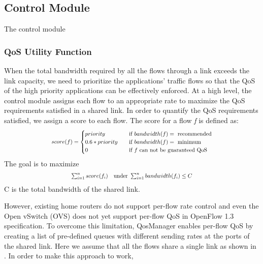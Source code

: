 %

\subsection{Control Module}
The control module 
\subsubsection{QoS Utility Function}
\label{sect:qos untility funciton}
When the total bandwidth required by all the flows through a link exceeds the link capacity, we need to prioritize the applications'
traffic flows so that the QoS of the high priority applications can be effectively enforced. At a high level, the control module
assigns each flow to an appropriate rate to maximize the QoS requirements satisfied in a shared link. In order to quantify the QoS
requirements satisfied, we assign a score to each flow. The score for a flow \emph{f} is defined as:
\begin{equation}
\scalebox{0.8}{
  $score(f) =
    \begin{cases}
      priority       & \quad \text{if } bandwidth(f) = \text{ recommended}\\
      0.6 * priority & \quad \text{if } bandwidth(f) = \text{ minimum}\\
      0              & \quad \text{if } f \text{ can not be guaranteed QoS}\\
    \end{cases}$
}
\end{equation}
The goal is to maximize 
\begin{equation}
\scalebox{0.8}{
 $\sum_{i=1}^{n} score(f_i) \quad \text{under } \sum_{i=1}^{n} bandwidth(f_i) \leq C $
}
\end{equation}
C is the total bandwidth of the shared link. 

However, existing home routers do not support per-flow rate control and even the Open vSwitch (OVS) does not yet support per-flow QoS
in OpenFlow 1.3 specification. To overcome this limitation, QosManager enables per-flow QoS by creating a list of pre-defined queues
with different sending rates at the ports of the shared link. Here we assume that all the flows share a single link as shown in .
In order to make this approach to work, 



